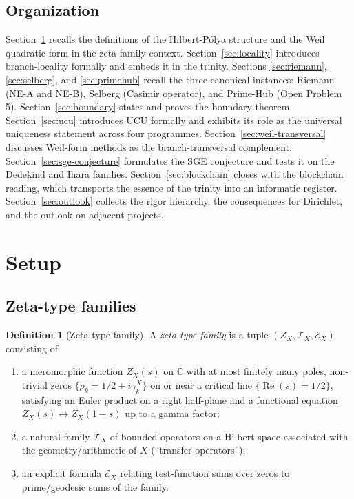 \documentclass[11pt]{article}
\theoremstyle{definition}
\newtheorem{definition}[theorem]{Definition}
\theoremstyle{remark}
\renewcommand{\Re}{\operatorname{Re}}
\begin{document}
\subsection{Organization}
\label{sec:intro-organization}

Section~\ref{sec:setup} recalls the definitions of the
Hilbert-P\'olya structure and the Weil quadratic form in the
zeta-family context. Section~\ref{sec:locality} introduces
branch-locality formally and embeds it in the trinity. Sections
\ref{sec:riemann}, \ref{sec:selberg}, and \ref{sec:primehub} recall
the three canonical instances: Riemann (NE-A and NE-B), Selberg
(Casimir operator), and Prime-Hub (Open Problem 5).
Section~\ref{sec:boundary} states and proves the boundary theorem.
Section~\ref{sec:ucu} introduces UCU formally and exhibits its
role as the universal uniqueness statement across four programmes.
Section~\ref{sec:weil-transversal} discusses Weil-form methods as
the branch-transversal complement. Section~\ref{sec:sge-conjecture}
formulates the SGE conjecture and tests it on the Dedekind and
Ihara families. Section~\ref{sec:blockchain} closes with the
blockchain reading, which transports the essence of the trinity
into an informatic register. Section~\ref{sec:outlook} collects
the rigor hierarchy, the consequences for Dirichlet, and the
outlook on adjacent projects.

\section{Setup}
\label{sec:setup}

\subsection{Zeta-type families}
\label{sec:zeta-family}

\begin{definition}[Zeta-type family]\label{def:zeta-family}
A \emph{zeta-type family} is a tuple $(Z_X, \mathcal{T}_X, \mathcal{E}_X)$
consisting of
\begin{enumerate}
\item a meromorphic function $Z_X(s)$ on $\mathbb{C}$ with at most
  finitely many poles, non-trivial zeros $\{\rho_k = 1/2 + i\gamma_k^X\}$
  on or near a critical line $\{\Re(s) = 1/2\}$, satisfying an Euler
  product on a right half-plane and a functional equation
  $Z_X(s) \leftrightarrow Z_X(1-s)$ up to a gamma factor;
\item a natural family $\mathcal{T}_X$ of bounded operators on a
  Hilbert space associated with the geometry/arithmetic of $X$
  (``transfer operators'');
\item an explicit formula $\mathcal{E}_X$ relating test-function
  sums over zeros to prime/geodesic sums of the family.
\end{enumerate}
\end{definition}
\end{document}
